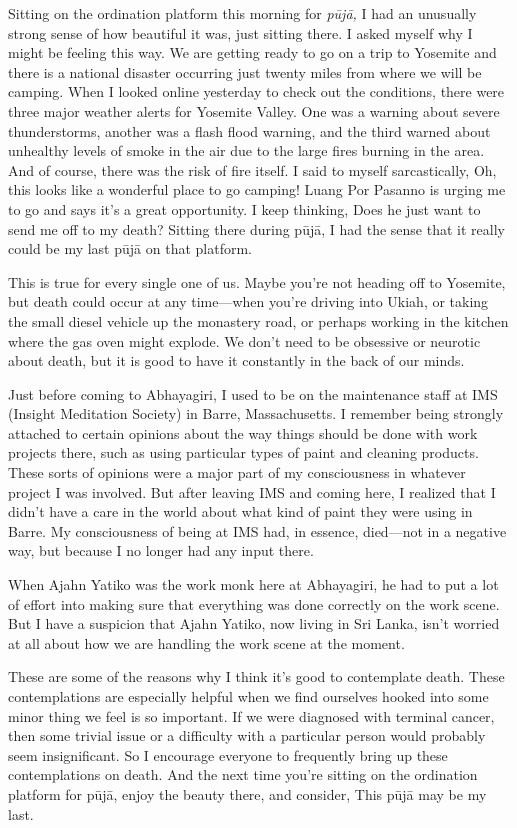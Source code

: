 Sitting on the ordination platform this morning for \emph{pūjā,} I 
had an unusually strong sense of how beautiful it was, just sitting 
there. I asked myself why I might be feeling this way. We are getting 
ready to go on a trip to Yosemite and there is a national disaster 
occurring just twenty miles from where we will be camping. When I 
looked online yesterday to check out the conditions, there were three 
major weather alerts for Yosemite Valley. One was a warning about 
severe thunderstorms, another was a flash flood warning, and the third 
warned about unhealthy levels of smoke in the air due to the large 
fires burning in the area. And of course, there was the risk of fire 
itself. I said to myself sarcastically, Oh, this looks like a wonderful 
place to go camping! Luang Por Pasanno is urging me to go and says it's 
a great opportunity. I keep thinking, Does he just want to send me off 
to my death? Sitting there during pūjā, I had the sense that it 
really could be my last pūjā on that platform.

This is true for every single one of us. Maybe you're not heading off 
to Yosemite, but death could occur at any time---when you're driving 
into Ukiah, or taking the small diesel vehicle up the monastery road, 
or perhaps working in the kitchen where the gas oven might explode. We 
don't need to be obsessive or neurotic about death, but it is good to 
have it constantly in the back of our minds.

Just before coming to Abhayagiri, I used to be on the maintenance staff 
at IMS (Insight Meditation Society) in Barre, Massachusetts. I remember 
being strongly attached to certain opinions about the way things should 
be done with work projects there, such as using particular types of 
paint and cleaning products. These sorts of opinions were a major part 
of my consciousness in whatever project I was involved. But after 
leaving IMS and coming here, I realized that I didn't have a care in 
the world about what kind of paint they were using in Barre. My 
consciousness of being at IMS had, in essence, died---not in a negative 
way, but because I no longer had any input there.

When Ajahn Yatiko was the work monk here at Abhayagiri, he had to put a 
lot of effort into making sure that everything was done correctly on 
the work scene. But I have a suspicion that Ajahn Yatiko, now living in 
Sri Lanka, isn't worried at all about how we are handling the work 
scene at the moment.

These are some of the reasons why I think it's good to contemplate 
death. These contemplations are especially helpful when we find 
ourselves hooked into some minor thing we feel is so important. If we 
were diagnosed with terminal cancer, then some trivial issue or a 
difficulty with a particular person would probably seem insignificant. 
So I encourage everyone to frequently bring up these contemplations on 
death. And the next time you're sitting on the ordination platform for 
pūjā, enjoy the beauty there, and consider, This pūjā may be my 
last.


